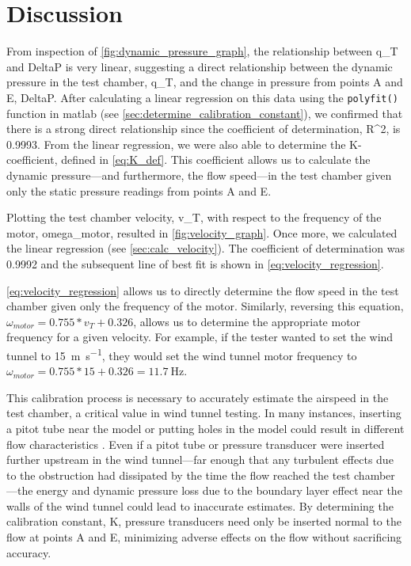 \chapter{Discussion}
\label{cp:discussion}
From inspection of \autoref{fig:dynamic_pressure_graph}, the relationship between \gls{q_T} and \gls{DeltaP} is very linear, suggesting a direct relationship between the dynamic pressure in the test chamber, \gls{q_T}, and the change in pressure from points A and E, \gls{DeltaP}. After calculating a linear regression on this data using the \verb|polyfit()| function in \acrshort{matlab} (see \autoref{sec:determine_calibration_constant}), we confirmed that there is a strong direct relationship since the coefficient of determination, \gls{R^2}, is \num{0.9993}. From the linear regression, we were also able to determine the \gls{K}-coefficient, defined in \autoref{eq:K_def}. This coefficient allows us to calculate the dynamic pressure—and furthermore, the flow speed—in the test chamber given only the static pressure readings from points A and E.

Plotting the test chamber velocity, \gls{v_T}, with respect to the frequency of the motor, \gls{omega_motor}, resulted in \autoref{fig:velocity_graph}. Once more, we calculated the linear regression (see \autoref{sec:calc_velocity}). The coefficient of determination was \num{0.9992} and the subsequent line of best fit is shown in \autoref{eq:velocity_regression}.

\autoref{eq:velocity_regression} allows us to directly determine the flow speed in the test chamber given only the frequency of the motor. Similarly, reversing this equation, 
$\omega_{motor} = 0.755 * v_T + 0.326$, allows us to determine the appropriate motor frequency for a given velocity. For example, if the tester wanted to set the wind tunnel to \qty{15}{\meter\per\second}, they would set the wind tunnel motor frequency to $\omega_{motor} = 0.755 * 15 + 0.326 = \qty{11.7}{\hertz}$.

This calibration process is necessary to accurately estimate the airspeed in the test chamber, a critical value in wind tunnel testing. In many instances, inserting a pitot tube near the model or putting holes in the model could result in different flow characteristics \citep{lecture4-notes}. Even if a pitot tube or pressure transducer were inserted further upstream in the wind tunnel—far enough that any turbulent effects due to the obstruction had dissipated by the time the flow reached the test chamber—the energy and dynamic pressure loss due to the boundary layer effect near the walls of the wind tunnel could lead to inaccurate estimates. By determining the calibration constant, \gls{K}, pressure transducers need only be inserted normal to the flow at points A and E, minimizing adverse effects on the flow without sacrificing accuracy.

